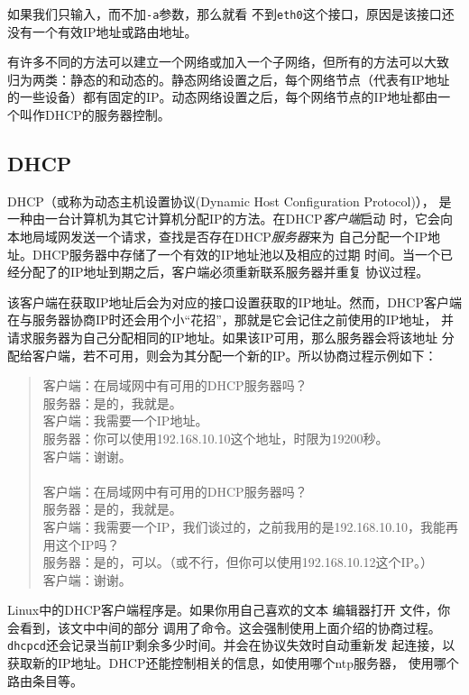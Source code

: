如果我们只输入，而不加\texttt{-a}参数，那么就看
不到\texttt{eth0}这个接口，原因是该接口还没有一个有效IP地址或路由地址。

有许多不同的方法可以建立一个网络或加入一个子网络，但所有的方法可以大致
归为两类：静态的和动态的。静态网络设置之后，每个网络节点（代表有IP地址
的一些设备）都有固定的IP。动态网络设置之后，每个网络节点的IP地址都由一
个叫作DHCP的服务器控制。

\subsection{DHCP}
\label{sec:networkConfiguration:tcpIP:dhcp}
DHCP（或称为动态主机设置协议(Dynamic Host Configuration Protocol)），
是一种由一台计算机为其它计算机分配IP的方法。在DHCP\textit{客户端}启动
时，它会向本地局域网发送一个请求，查找是否存在DHCP\textit{服务器}来为
自己分配一个IP地址。DHCP服务器中存储了一个有效的IP地址池以及相应的过期
时间。当一个已经分配了的IP地址到期之后，客户端必须重新联系服务器并重复
协议过程。

该客户端在获取IP地址后会为对应的接口设置获取的IP地址。然而，DHCP客户端
在与服务器协商IP时还会用个小``花招''，那就是它会记住之前使用的IP地址，
并请求服务器为自己分配相同的IP地址。如果该IP可用，那么服务器会将该地址
分配给客户端，若不可用，则会为其分配一个新的IP。所以协商过程示例如下：

\begin{quote}
  客户端：在局域网中有可用的DHCP服务器吗？\\
  服务器：是的，我就是。\\
  客户端：我需要一个IP地址。\\
  服务器：你可以使用192.168.10.10这个地址，时限为19200秒。\\
  客户端：谢谢。\\
  \\
  客户端：在局域网中有可用的DHCP服务器吗？\\
  服务器：是的，我就是。\\
  客户端：我需要一个IP，我们谈过的，之前我用的是192.168.10.10，我能再
  用这个IP吗？\\
  服务器：是的，可以。（或不行，但你可以使用192.168.10.12这个IP。）\\
  客户端：谢谢。\\
\end{quote}

Linux中的DHCP客户端程序是。如果你用自己喜欢的文本
编辑器打开  文件，你会看到，该文中中间的部分
调用了命令。这会强制使用上面介绍的协商过程。
\texttt{dhcpcd}还会记录当前IP剩余多少时间。并会在协议失效时自动重新发
起连接，以获取新的IP地址。DHCP还能控制相关的信息，如使用哪个ntp服务器，
使用哪个路由条目等。


